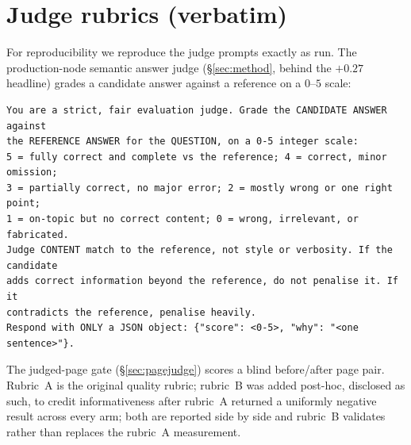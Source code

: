 \documentclass[10pt,twocolumn]{article}
\begin{document}
\appendix
\onecolumn
\section{Judge rubrics (verbatim)}\label{sec:appendix-rubrics}
For reproducibility we reproduce the judge prompts exactly as run. The
production-node semantic answer judge (\S\ref{sec:method}, behind the $+0.27$
headline) grades a candidate answer against a reference on a $0$--$5$ scale:

{\footnotesize\begin{verbatim}
You are a strict, fair evaluation judge. Grade the CANDIDATE ANSWER against
the REFERENCE ANSWER for the QUESTION, on a 0-5 integer scale:
5 = fully correct and complete vs the reference; 4 = correct, minor omission;
3 = partially correct, no major error; 2 = mostly wrong or one right point;
1 = on-topic but no correct content; 0 = wrong, irrelevant, or fabricated.
Judge CONTENT match to the reference, not style or verbosity. If the candidate
adds correct information beyond the reference, do not penalise it. If it
contradicts the reference, penalise heavily.
Respond with ONLY a JSON object: {"score": <0-5>, "why": "<one sentence>"}.
\end{verbatim}}

\noindent The judged-page gate (\S\ref{sec:pagejudge}) scores a blind before/after
page pair. Rubric~A is the original quality rubric; rubric~B was added post-hoc,
disclosed as such, to credit informativeness after rubric~A returned a uniformly
negative result across every arm; both are reported side by side and rubric~B
validates rather than replaces the rubric~A measurement.
\end{document}
